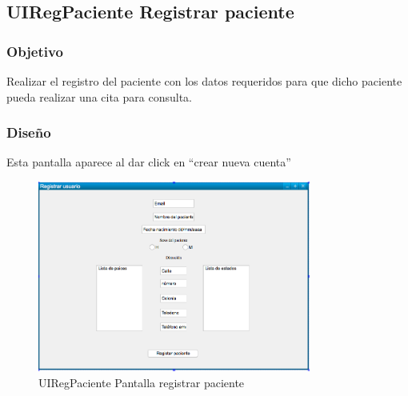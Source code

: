 \subsection{UIRegPaciente Registrar paciente}

\subsubsection{Objetivo}
    Realizar el registro del paciente con los datos requeridos para que dicho paciente pueda realizar una cita para consulta. 

\subsubsection{Diseño}
    Esta pantalla aparece al dar click en ``crear nueva cuenta''

\begin{figure}[htbp!]
        \centering
            \includegraphics[width=0.8\textwidth]{images/UIRegPaciente}
        \caption{UIRegPaciente Pantalla registrar paciente}
    \end{figure}


